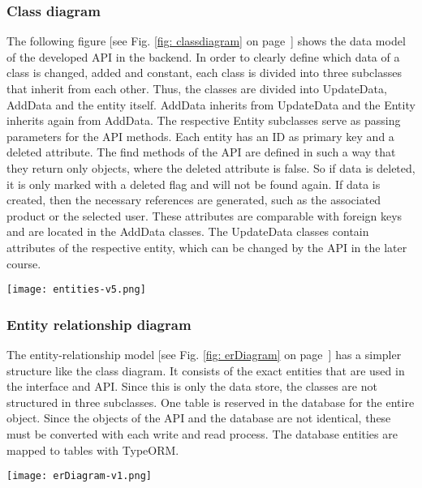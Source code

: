     \subsubsection*{Class diagram}
    The following figure [see Fig. \ref{fig: classdiagram} on page~\pageref{fig: classdiagram}] shows the data model of the developed API in the backend. In order to clearly define which data of a class is changed, added and constant, each class is divided into three subclasses that inherit from each other. Thus, the classes are divided into UpdateData, AddData and the entity itself. AddData inherits from UpdateData and the Entity inherits again from AddData. The respective Entity subclasses serve as passing parameters for the API methods. Each entity has an ID as primary key and a deleted attribute. The find methods of the API are defined in such a way that they return only objects, where the deleted attribute is false. So if data is deleted, it is only marked with a deleted flag and will not be found again. If data is created, then the necessary references are generated, such as the associated product or the selected user. These attributes are comparable with foreign keys and are located in the AddData classes. The UpdateData classes contain attributes of the respective entity, which can be changed by the API in the later course. 

    \begin{figure*}[t]
        \centering
        \texttt{[image: entities-v5.png]}
        \caption{Data model}
        \label{fig: classdiagram}
    \end{figure*}

    \subsubsection*{Entity relationship diagram} %
    The entity-relationship model [see Fig. \ref{fig: erDiagram} on page~\pageref{fig: erDiagram}] has a simpler structure like the class diagram. It consists of the exact entities that are used in the interface and API. Since this is only the data store, the classes are not structured in three subclasses. One table is reserved in the database for the entire object. Since the objects of the API and the database are not identical, these must be converted with each write and read process. The database entities are mapped to tables with TypeORM. 

    \begin{figure*}[t]
        \centering
        \texttt{[image: erDiagram-v1.png]}
        \caption{Entity relationship diagram}
        \label{fig: erDiagram}
    \end{figure*}

